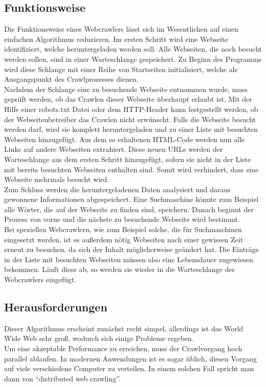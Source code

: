 \subsection{Funktionsweise}
Die Funktionsweise eines Webcrawlers lässt sich im Wesentlichen auf einen einfachen Algorithmus reduzieren. Im ersten Schritt wird eine Webseite identifiziert, welche heruntergeladen werden soll. Alle Webseiten, die noch besucht werden sollen, sind in einer Warteschlange gespeichert. Zu Beginn des Programms wird diese Schlange mit einer Reihe von Startseiten initialisiert, welche als Ausgangspunkt des Crawlprozesses dienen.\\
Nachdem der Schlange eine zu besuchende Webseite entnommen wurde, muss geprüft werden, ob das Crawlen dieser Webseite überhaupt erlaubt ist. Mit der Hilfe einer robots.txt Datei oder dem HTTP-Header kann festgestellt werden, ob der Webseitenbetreiber das Crawlen nicht erwünscht. Falls die Webseite besucht werden darf, wird sie komplett heruntergeladen und zu einer Liste mit besuchten Webseiten hinzugefügt. Aus dem so erhaltenen HTML-Code werden nun alle Links auf andere Webseiten extrahiert. Diese neuen URLs werden der Warteschlange aus dem ersten Schritt hinzugefügt, sofern sie nicht in der Liste mit bereits besuchten Webseiten enthalten sind. Somit wird verhindert, dass eine Webseite mehrmals besucht wird. \\
Zum Schluss werden die heruntergeladenen Daten analysiert und daraus gewonnene Informationen abgespeichert. Eine Suchmaschine könnte zum Beispiel alle Wörter, die auf der Webseite zu finden sind, speichern. Danach beginnt der Prozess von vorne und die nächste zu besuchende Webseite wird bestimmt.\cite{WebCrawlerProcess} \\
Bei speziellen Webcrawlern, wie zum Beispiel solche, die für Suchmaschinen eingesetzt werden, ist es außerdem nötig Webseiten nach einer gewissen Zeit erneut zu besuchen, da sich der Inhalt möglicherweise geändert hat. Die Einträge in der Liste mit besuchten Webseiten müssen also eine Lebensdauer zugewiesen bekommen. Läuft diese ab, so werden sie wieder in die Warteschlange des Webcrawlers eingefügt.
\subsection{Herausforderungen}
Dieser Algorithmus erscheint zunächst recht simpel, allerdings ist das World Wide Web sehr groß, wodurch sich einige Probleme ergeben. \cite{WebCrawlerChallenges}\\ 
Um eine akzeptable Performance zu erreichen, muss der Crawlvorgang hoch parallel ablaufen. In modernen Anwendungen ist es sogar üblich, diesen Vorgang auf viele verschiedene Computer zu verteilen. In einem solchen Fall spricht man dann von \enquote{distributed web crawling}. 

